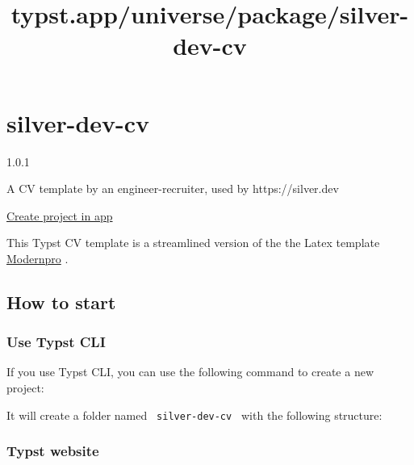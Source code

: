 \title{typst.app/universe/package/silver-dev-cv}

\label{banner}
\label{template-thumbnail}

\section{silver-dev-cv}\label{silver-dev-cv}

{ 1.0.1 }

A CV template by an engineer-recruiter, used by https://silver.dev

\href{/app?template=silver-dev-cv&version=1.0.1}{Create project in app}

\label{readme}
This Typst CV template is a streamlined version of the the Latex
template \href{https://github.com/jxpeng98/Typst-CV-Resume}{Modernpro} .

\subsection{How to start}\label{how-to-start}

\subsubsection{Use Typst CLI}\label{use-typst-cli}

If you use Typst CLI, you can use the following command to create a new
project:

\begin{Shaded}
\begin{Highlighting}[]
\end{Highlighting}
\end{Shaded}

It will create a folder named \texttt{\ silver-dev-cv\ } with the
following structure:

\begin{Shaded}
\begin{Highlighting}[]
\end{Highlighting}
\end{Shaded}

\subsubsection{Typst website}\label{typst-website}

